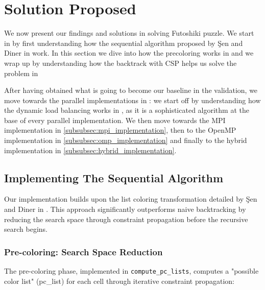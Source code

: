 \section{Solution Proposed}
\label{sec:solution}

We now present our findings and solutions in solving Futoshiki puzzle. We start in  by first understanding how the sequential algorithm proposed by Şen and Diner in \cite{Sen2024Futoshiki} work. In this section we dive into how the precoloring works in  and we wrap up by understanding how the backtrack with CSP helps us solve the problem in 

After having obtained what is going to become our baseline in the validation, we move towards the parallel implementations in : we start off by understanding how the dynamic load balancing works in , as it is a sophisticated algorithm at the base of every parallel implementation. We then move towards the MPI implementation in \cref{subsubsec:mpi_implementation}, then to the OpenMP implementation in \cref{subsubsec:omp_implementation} and finally to the hybrid implementation in \cref{subsubsec:hybrid_implementation}.

\subsection{Implementing The Sequential Algorithm}
\label{subsec:paper_implementation}
Our implementation builds upon the list coloring transformation detailed by Şen and Diner in \cite{Sen2024Futoshiki}. This approach significantly outperforms naive backtracking by reducing the search space through constraint propagation before the recursive search begins. 

\subsubsection{Pre-coloring: Search Space Reduction}
\label{subsubsec:precoloring}
The pre-coloring phase, implemented in \texttt{compute\_pc\_lists}, computes a "possible color list" (pc\_list) for each cell through iterative constraint propagation:

